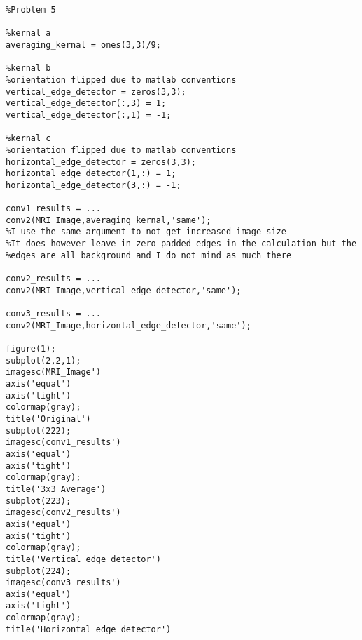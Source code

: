 \documentclass[12pt]{article}
\begin{document}
\begin{lstlisting}[style=Matlab-editor]
%%
%Problem 5

%kernal a
averaging_kernal = ones(3,3)/9;

%kernal b
%orientation flipped due to matlab conventions
vertical_edge_detector = zeros(3,3);
vertical_edge_detector(:,3) = 1;
vertical_edge_detector(:,1) = -1;

%kernal c
%orientation flipped due to matlab conventions
horizontal_edge_detector = zeros(3,3);
horizontal_edge_detector(1,:) = 1;
horizontal_edge_detector(3,:) = -1;

conv1_results = ...
conv2(MRI_Image,averaging_kernal,'same');
%I use the same argument to not get increased image size
%It does however leave in zero padded edges in the calculation but the
%edges are all background and I do not mind as much there

conv2_results = ...
conv2(MRI_Image,vertical_edge_detector,'same');

conv3_results = ...
conv2(MRI_Image,horizontal_edge_detector,'same');

figure(1);
subplot(2,2,1);
imagesc(MRI_Image')
axis('equal')
axis('tight')
colormap(gray);
title('Original')
subplot(222);
imagesc(conv1_results')
axis('equal')
axis('tight')
colormap(gray);
title('3x3 Average')
subplot(223);
imagesc(conv2_results')
axis('equal')
axis('tight')
colormap(gray);
title('Vertical edge detector')
subplot(224);
imagesc(conv3_results')
axis('equal')
axis('tight')
colormap(gray);
title('Horizontal edge detector')

\end{lstlisting}

\end{document}
